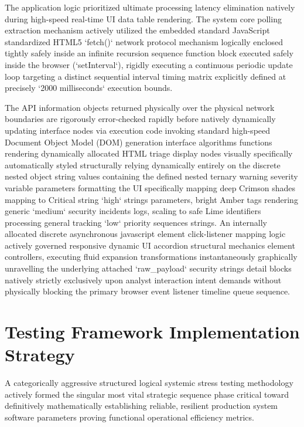 The application logic prioritized ultimate processing latency elimination natively during high-speed real-time UI data table rendering. The system core polling extraction mechanism actively utilized the embedded standard JavaScript standardized HTML5 `fetch()` network protocol mechanism logically enclosed tightly safely inside an infinite recursion sequence function block executed safely inside the browser (`setInterval`), rigidly executing a continuous periodic update loop targeting a distinct sequential interval timing matrix explicitly defined at precisely `2000 milliseconds` execution bounds. 

The API information objects returned physically over the physical network boundaries are rigorously error-checked rapidly before natively dynamically updating interface nodes via execution code invoking standard high-speed Document Object Model (DOM) generation interface algorithms functions rendering dynamically allocated HTML triage display nodes visually specifically automatically styled structurally relying dynamically entirely on the discrete nested object string values containing the defined nested ternary warning severity variable parameters formatting the UI specifically mapping deep Crimson shades mapping to Critical string `high` strings parameters, bright Amber tags rendering generic `medium` security incidents logs, scaling to safe Lime identifiers processing general tracking `low` priority sequences strings.  An internally allocated discrete asynchronous javascript element click-listener mapping logic actively governed responsive dynamic UI accordion structural mechanics element controllers, executing fluid expansion transformations instantaneously graphically unravelling the underlying attached `raw\_payload` security strings detail blocks natively strictly exclusively upon analyst interaction intent demands without physically blocking the primary browser event listener timeline queue sequence.

\section{Testing Framework Implementation Strategy}
A categorically aggressive structured logical systemic stress testing methodology actively formed the singular most vital strategic sequence phase critical toward definitively mathematically establishing reliable, resilient production system software parameters proving functional operational efficiency metrics. 

